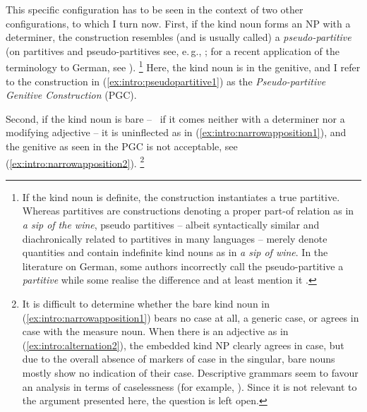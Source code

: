 \begin{exe}
  \ex\label{ex:intro:alternation}
  \begin{xlist}
  \end{xlist}
\end{exe}

This specific configuration has to be seen in the context of two other configurations, to which I turn now.
First, if the kind noun forms an NP with a determiner, the construction resembles (and is usually called) a \textit{pseudo-partitive} (on partitives and pseudo-partitives see, e.\,g., \citealp{Barker1998,Selkirk1977,Stickney2007,Vos1999}; for a recent application of the terminology to German, see \citealp{Gerstenberger2015}).%
\footnote{If the kind noun is definite, the construction instantiates a true partitive.
Whereas partitives are constructions denoting a proper part-of relation as in \textit{a sip of the wine}, pseudo partitives -- albeit syntactically similar and diachronically related to partitives in many languages -- merely denote quantities and contain indefinite kind nouns as in \textit{a sip of wine}.
In the literature on German, some authors incorrectly call the pseudo-partitive a \textit{partitive} \citep{Hentschel1993} while some realise the difference and at least mention it \citep{Eschenbach1994,GallmannLindauer1994,Loebel1989,Zimmer2015}.
}
Here, the kind noun is in the genitive, and I refer to the construction in (\ref{ex:intro:pseudopartitive1}) as the \textit{Pseudo-partitive Genitive Construction} (PGC).

\begin{exe}
\end{exe}

Second, if the kind noun is bare -- \ie\ if it comes neither with a determiner nor a modifying adjective -- it is uninflected as in (\ref{ex:intro:narrowapposition1}), and the genitive as seen in the PGC is not acceptable, see (\ref{ex:intro:narrowapposition2}).%
\footnote{
It is difficult to determine whether the bare kind noun in (\ref{ex:intro:narrowapposition1}) bears no case at all, a generic case, or agrees in case with the measure noun.
When there is an adjective as in (\ref{ex:intro:alternation2}), the embedded kind NP clearly agrees in case, but due to the overall absence of markers of case in the singular, bare nouns mostly show no indication of their case.
Descriptive grammars seem to favour an analysis in terms of caselessness (for example, \citealp[1981]{ZifonunEa1997c}).
Since it is not relevant to the argument presented here, the question is left open. 
}

